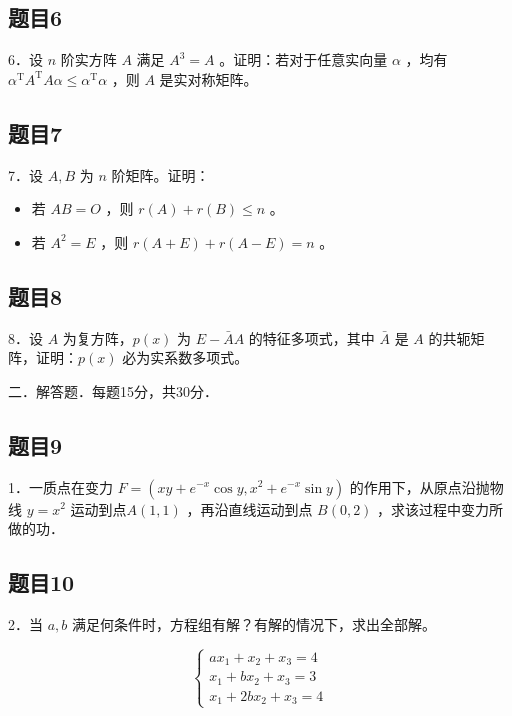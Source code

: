 \documentclass{article}
\begin{document}
\subsection{题目6}
6．设 \(n\) 阶实方阵 \(A\) 满足 \(A^{3}=A\) 。证明：若对于任意实向量 \(\alpha\) ，均有 \(\alpha^{\mathrm{T}} A^{\mathrm{T}} A \alpha \leq \alpha^{\mathrm{T}} \alpha\) ，则 \(A\) 是实对称矩阵。

\subsection{题目7}
7．设 \(A, B\) 为 \(n\) 阶矩阵。证明：

\begin{itemize}
  \item[（1）] 若 \(A B=O\) ，则 \(r(A)+r(B) \leq n\) 。
  \item[（2）] 若 \(A^{2}=E\) ，则 \(r(A+E)+r(A-E)=n\) 。
\end{itemize}

\subsection{题目8}
8．设 \(A\) 为复方阵，\(p(x)\) 为 \(E-\bar{A} A\) 的特征多项式，其中 \(\bar{A}\) 是 \(A\) 的共轭矩阵，证明：\(p(x)\) 必为实系数多项式。

二．解答题．每题15分，共30分．\\

\subsection{题目9}
1．一质点在变力 \(F=\left(x y+e^{-x} \cos y, x^{2}+e^{-x} \sin y\right)\) 的作用下，从原点沿抛物线 \(y=x^{2}\) 运动到点\(A(1,1)\) ，再沿直线运动到点 \(B(0,2)\) ，求该过程中变力所做的功．

\subsection{题目10}
2．当 \(a, b\) 满足何条件时，方程组有解？有解的情况下，求出全部解。

\[
\left\{\begin{array}{l}
a x_{1}+x_{2}+x_{3}=4 \\
x_{1}+b x_{2}+x_{3}=3 \\
x_{1}+2 b x_{2}+x_{3}=4
\end{array}\right.
\]
\end{document}
